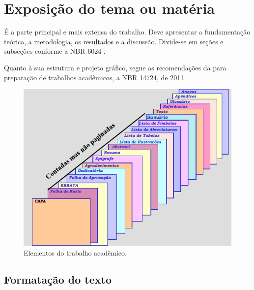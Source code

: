 \section{Exposição do tema ou matéria}

É a parte principal e mais extensa do trabalho. Deve apresentar a fundamentação teórica, a metodologia, os resultados e a discussão. Divide-se em seções e subseções conforme a NBR 6024 \cite{NBR6024:2012}.

Quanto à sua estrutura e projeto gráfico, segue as recomendações da  para preparação de trabalhos acadêmicos, a NBR 14724, de 2011 \cite{NBR14724:2011}.

\begin{figure}[htb]
	\caption{\label{fig:Fig_1}Elementos do trabalho acadêmico.}
	\begin{center}
		\includegraphics{images/imagem.pdf}
	\end{center}
\end{figure}

\subsection{Formatação do texto}

